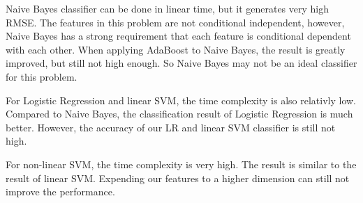 \documentclass{article} %
\begin{document}
 
Naive Bayes classifier can be done in linear time, but it generates very high RMSE. The features in this problem are not conditional independent, however, Naive Bayes has a strong requirement that each feature is conditional dependent with each other. When applying AdaBoost to Naive Bayes, the result is greatly improved, but still not high enough. So Naive Bayes may not be an ideal classifier for this problem.

For Logistic Regression and linear SVM, the time complexity is also relativly low. Compared to Naive Bayes, the classification result of Logistic Regression is much better. However, the accuracy of our LR and linear SVM classifier is still not high. 

For non-linear SVM, the time complexity is very high. The result is similar to the result of linear SVM. Expending our features to a higher dimension can still not improve the performance.

\end{document}
